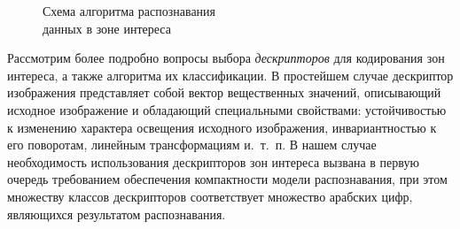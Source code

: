 \begin{figure}[h!]
  \centering
  \caption{Схема алгоритма распознавания \\ данных в зоне интереса}
  \label{fig:design_algorithm_recognition}
\end{figure}

Рассмотрим более подробно вопросы выбора \textit{дескрипторов}
для кодирования зон интереса, а также алгоритма их классификации.
В простейшем случае дескриптор изображения представляет собой вектор
вещественных значений, описывающий исходное изображение и обладающий
специальными свойствами:
устойчивостью к изменению характера освещения исходного изображения,
инвариантностью к его поворотам, линейным трансформациям и.~т.~п.
В нашем случае необходимость использования дескрипторов зон интереса
вызвана в первую очередь требованием обеспечения компактности модели распознавания,
при этом множеству классов дескрипторов соответствует множество арабских цифр,
являющихся результатом распознавания.

